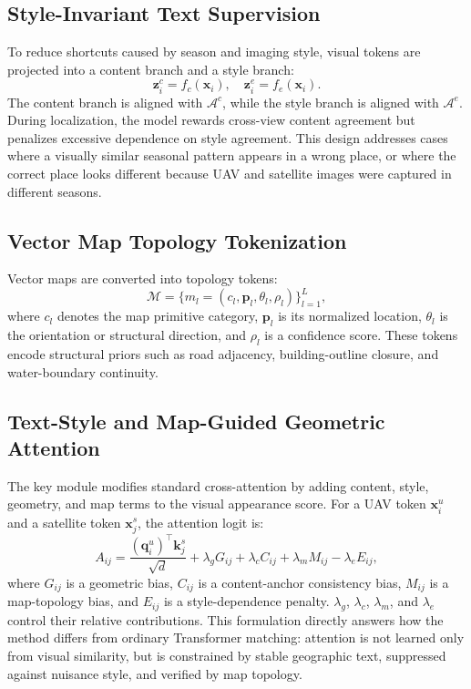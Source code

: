 \documentclass[journal]{IEEEtran}
\begin{document}
\subsection{Style-Invariant Text Supervision}
To reduce shortcuts caused by season and imaging style, visual tokens are projected into a content branch and a style branch:
\begin{equation}
  \mathbf{z}^{c}_{i}=f_c(\mathbf{x}_{i}), \quad
  \mathbf{z}^{e}_{i}=f_e(\mathbf{x}_{i}).
\end{equation}
The content branch is aligned with $\mathcal{A}^{c}$, while the style branch is aligned with $\mathcal{A}^{e}$. During localization, the model rewards cross-view content agreement but penalizes excessive dependence on style agreement. This design addresses cases where a visually similar seasonal pattern appears in a wrong place, or where the correct place looks different because UAV and satellite images were captured in different seasons.

\subsection{Vector Map Topology Tokenization}
Vector maps are converted into topology tokens:
\begin{equation}
  \mathcal{M} = \{m_l=(c_l,\mathbf{p}_l,\theta_l,\rho_l)\}_{l=1}^{L},
\end{equation}
where $c_l$ denotes the map primitive category, $\mathbf{p}_l$ is its normalized location, $\theta_l$ is the orientation or structural direction, and $\rho_l$ is a confidence score. These tokens encode structural priors such as road adjacency, building-outline closure, and water-boundary continuity.

\subsection{Text-Style and Map-Guided Geometric Attention}
The key module modifies standard cross-attention by adding content, style, geometry, and map terms to the visual appearance score. For a UAV token $\mathbf{x}^{u}_{i}$ and a satellite token $\mathbf{x}^{s}_{j}$, the attention logit is:
\begin{equation}
\label{eq:lgm_attention}
  A_{ij} =
  \frac{(\mathbf{q}^{u}_{i})^{\top}\mathbf{k}^{s}_{j}}{\sqrt{d}}
  + \lambda_g G_{ij}
  + \lambda_c C_{ij}
  + \lambda_m M_{ij}
  - \lambda_e E_{ij},
\end{equation}
where $G_{ij}$ is a geometric bias, $C_{ij}$ is a content-anchor consistency bias, $M_{ij}$ is a map-topology bias, and $E_{ij}$ is a style-dependence penalty. $\lambda_g$, $\lambda_c$, $\lambda_m$, and $\lambda_e$ control their relative contributions. This formulation directly answers how the method differs from ordinary Transformer matching: attention is not learned only from visual similarity, but is constrained by stable geographic text, suppressed against nuisance style, and verified by map topology.
\end{document}
